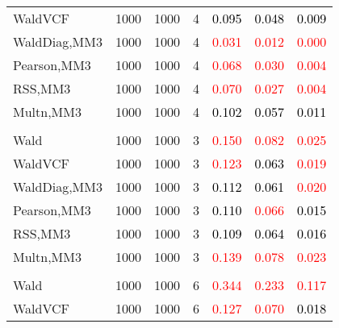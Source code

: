 \documentclass[
]{article}
\begin{document}
\begin{table}[H]
{\begin{tabular}[t]{lrrrrrr}
\hspace{1em}WaldVCF & 1000 & 1000 & 4 & \textcolor{black}{0.095} & \textcolor{black}{0.048} & \textcolor{black}{0.009}\\
\hspace{1em}WaldDiag,MM3 & 1000 & 1000 & 4 & \textcolor{red}{0.031} & \textcolor{red}{0.012} & \textcolor{red}{0.000}\\
\hspace{1em}Pearson,MM3 & 1000 & 1000 & 4 & \textcolor{red}{0.068} & \textcolor{red}{0.030} & \textcolor{red}{0.004}\\
\hspace{1em}RSS,MM3 & 1000 & 1000 & 4 & \textcolor{red}{0.070} & \textcolor{red}{0.027} & \textcolor{red}{0.004}\\
\hspace{1em}Multn,MM3 & 1000 & 1000 & 4 & \textcolor{black}{0.102} & \textcolor{black}{0.057} & \textcolor{black}{0.011}\\
\addlinespace[0.3em]
\multicolumn{7}{l}{\textbf{1F 15V}}\\
\hspace{1em}Wald & 1000 & 1000 & 3 & \textcolor{red}{0.150} & \textcolor{red}{0.082} & \textcolor{red}{0.025}\\
\hspace{1em}WaldVCF & 1000 & 1000 & 3 & \textcolor{red}{0.123} & \textcolor{black}{0.063} & \textcolor{red}{0.019}\\
\hspace{1em}WaldDiag,MM3 & 1000 & 1000 & 3 & \textcolor{black}{0.112} & \textcolor{black}{0.061} & \textcolor{red}{0.020}\\
\hspace{1em}Pearson,MM3 & 1000 & 1000 & 3 & \textcolor{black}{0.110} & \textcolor{red}{0.066} & \textcolor{black}{0.015}\\
\hspace{1em}RSS,MM3 & 1000 & 1000 & 3 & \textcolor{black}{0.109} & \textcolor{black}{0.064} & \textcolor{black}{0.016}\\
\hspace{1em}Multn,MM3 & 1000 & 1000 & 3 & \textcolor{red}{0.139} & \textcolor{red}{0.078} & \textcolor{red}{0.023}\\
\addlinespace[0.3em]
\multicolumn{7}{l}{\textbf{2F 10V}}\\
\hspace{1em}Wald & 1000 & 1000 & 6 & \textcolor{red}{0.344} & \textcolor{red}{0.233} & \textcolor{red}{0.117}\\
\hspace{1em}WaldVCF & 1000 & 1000 & 6 & \textcolor{red}{0.127} & \textcolor{red}{0.070} & \textcolor{black}{0.018}\\

\end{tabular}}
\end{table}
\end{document}
